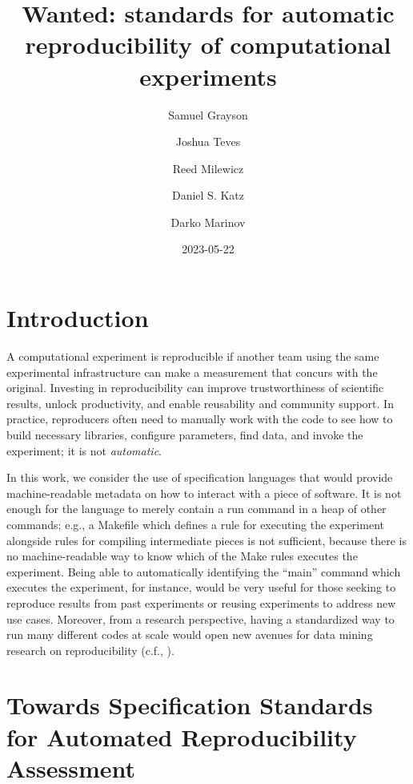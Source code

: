 \documentclass[manuscript,authordraft]{acmart}
\title{Wanted: standards for automatic reproducibility of computational
experiments}
\author{Samuel Grayson}
\affiliation{%
    \institution{University of Illinois Urbana-Champaign}%
    \department{Department of Computer Science}%
    \streetaddress{201 North Goodwin Avenue MC 258}%
    \city{Urbana}%
    \state{IL}%
    \postcode{61801-2302}%
    \country{USA}%
    }
\author{Joshua Teves}
\affiliation{%
    \institution{Sandia National Laboratories}%
    \department{Software Engineering and Research Department}%
    \streetaddress{1515 Eubank Blvd SE1515 Eubank Blvd SE}%
    \city{Albuquerque}%
    \state{NM}%
    \postcode{87123}%
    \country{USA}%
    }
\author{Reed Milewicz}
\affiliation{%
    \institution{Sandia National Laboratories}%
    \department{Software Engineering and Research Department}%
    \streetaddress{1515 Eubank Blvd SE1515 Eubank Blvd SE}%
    \city{Albuquerque}%
    \state{NM}%
    \postcode{87123}%
    \country{USA}%
    }
\author{Daniel S. Katz}
\affiliation{%
    \institution{University of Illinois Urbana-Champaign Department of
Computer Science}%
    \department{Department of Computer Science}%
    \streetaddress{201 North Goodwin Avenue MC 258}%
    \city{Urbana}%
    \state{IL}%
    \postcode{61801-2302}%
    \country{USA}%
    }
\author{Darko Marinov}
\affiliation{%
    \institution{University of Illinois Urbana-Champaign}%
    \department{Department of Computer Science}%
    \streetaddress{201 North Goodwin Avenue MC 258}%
    \city{Urbana}%
    \state{IL}%
    \postcode{61801-2302}%
    \country{USA}%
    }
\date{2023-05-22}
\begin{document}
\maketitle

\renewcommand{\shortauthors}{Grayson et al.}


\hypertarget{introduction}{%
\section{Introduction}\label{introduction}}

A computational experiment is reproducible if another team using the
same experimental infrastructure can make a measurement that concurs
with the original. Investing in reproducibility can improve
trustworthiness of scientific results, unlock productivity, and enable
reusability and community support\cite{ivie2018reproducibility}. In
practice, reproducers often need to manually work with the code to see
how to build necessary libraries, configure parameters, find data, and
invoke the experiment; it is not \emph{automatic}.

In this work, we consider the use of specification languages that would
provide machine-readable metadata on how to interact with a piece of
software. It is not enough for the language to merely contain a run
command in a heap of other commands; e.g., a Makefile which defines a
rule for executing the experiment alongside rules for compiling
intermediate pieces is not sufficient, because there is no
machine-readable way to know which of the Make rules executes the
experiment. Being able to automatically identifying the ``main'' command
which executes the experiment, for instance, would be very useful for
those seeking to reproduce results from past experiments or reusing
experiments to address new use cases. Moreover, from a research
perspective, having a standardized way to run many different codes at
scale would open new avenues for data mining research on reproducibility
(c.f., \cite{collberg_repeatability_2016}).

\hypertarget{towards-specification-standards-for-automated-reproducibility-assessment}{%
\section{Towards Specification Standards for Automated Reproducibility
Assessment}\label{towards-specification-standards-for-automated-reproducibility-assessment}}
\end{document}
